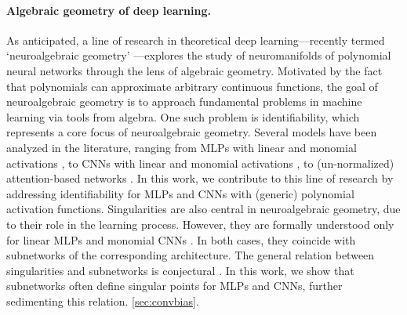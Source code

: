 \documentclass{article} %
\theoremstyle{plain}%
\theoremstyle{definition}
\theoremstyle{remark}
\begin{document}
\paragraph{Algebraic geometry of deep learning.} As anticipated, a line of research in theoretical deep learning---recently termed 
`neuroalgebraic geometry' \citep{marchetti2025invitationneuroalgebraicgeometry}---explores the study of neuromanifolds of polynomial neural networks through the lens of algebraic geometry. Motivated by the fact that polynomials can approximate arbitrary continuous functions, the goal of neuroalgebraic geometry is to approach fundamental  problems in machine learning via tools from algebra. One such problem is identifiability, which represents a core focus of neuroalgebraic geometry. Several models have been  analyzed in the literature, ranging from MLPs with linear \citep{trager2019pure} and monomial activations \citep{kileel2019expressive, finkel2024activation, kubjas2024geometry, marchetti2024harmonics}, to CNNs with linear  \citep{kohn2022geometry, kohn2024function, shahverdi2024algebraic} and monomial activations \citep{shahverdi2024geometryoptimizationpolynomialconvolutional}, to (un-normalized) attention-based networks \citep{henry2024geometrylightningselfattentionidentifiability}. In this work, we contribute to this line of research by addressing identifiability for MLPs and CNNs with (generic) polynomial activation functions. Singularities are also central in neuroalgebraic geometry, due to their role in the learning process. However, they are formally understood only for linear MLPs \citep{trager2019pure} and monomial CNNs \citep{shahverdi2024geometryoptimizationpolynomialconvolutional}. In both cases, they coincide with subnetworks of the corresponding architecture. The general relation between singularities and subnetworks is conjectural \citep{marchetti2025invitationneuroalgebraicgeometry}. In this work, we show that subnetworks often define singular points for MLPs and CNNs, further sedimenting this relation. \ref{sec:convbias}. 
\end{document}
